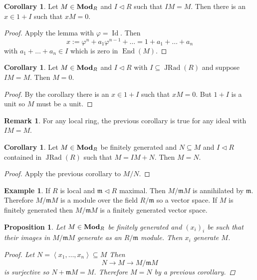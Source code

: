 \documentclass{article}
\DeclareMathOperator{\Id}{Id}
\DeclareMathOperator{\End}{End}
\DeclareMathOperator{\modules}{{\bf Mod}}
\newcommand{\gen}[1]{\left<#1\right>}
\DeclareMathOperator{\JRad}{JRad}
\newcommand{\maxid}{\mathfrak{m}}
\newcommand{\ideal}{\triangleleft}
\newtheorem{proposition}[theorem]{Proposition}
\theoremstyle{definition}
\newtheorem{remark}[theorem]{Remark}
\newtheorem{example}[theorem]{Example}
\newtheorem{corollary}[theorem]{Corollary}
\begin{document}
\begin{corollary}
    Let \(M\in\modules_{R}\) and \(I\ideal R\) such that \(IM=M\). Then there is
    an \(x\in 1+I\) such that \(xM=0\).

    \begin{proof}
        Apply the lemma with \(\varphi=\Id\). Then
        \[
            x:=\varphi^{n}+a_{1}\varphi^{n-1}+\ldots=1+a_{1}+\ldots+a_{n}
        \]
        with \(a_{1}+\ldots+a_{n}\in I\) which is zero in \(\End(M)\).
    \end{proof}
\end{corollary}

\begin{corollary}
    Let \(M\in\modules_{R}\) and \(I\ideal R\) with \(I\subseteq\JRad(R)\)
    and suppose \(IM=M\). Then \(M=0\).

    \begin{proof}
        By the corollary there is an \(x\in 1+I\) such that \(xM=0\). But
        \(1+I\) is a unit so \(M\) must be a unit.
    \end{proof}
\end{corollary}

\begin{remark}
    For any local ring, the previous corollary is true for any ideal with
    \(IM=M\).
\end{remark}

\begin{corollary}
    Let \(M\in\modules_{R}\) be finitely generated and \(N\subseteq M\) and
    \(I\ideal R\) contained in \(\JRad(R)\) such that \(M=IM+N\). Then \(M=N\).

    \begin{proof}
        Apply the previous corollary to \(M/N\).
    \end{proof}
\end{corollary}

\begin{example}
    If \(R\) is local and \(\maxid\ideal R\) maximal. Then \(M/\maxid M\) is
    annihilated by \(\maxid\). Therefore \(M/\maxid M\) is a module over the
    field \(R/\maxid\) so a vector space. If \(M\) is finitely generated then
    \(M/\maxid M\) is a finitely generated vector space.
\end{example}

\begin{proposition}
    Let \(M\in\modules_{R}\) be finitely generated and \((x_{i})_{i}\) be such
    that their images in \(M/\maxid M\) generate as an \(R/\maxid\) module. Then
    \(x_{i}\) generate \(M\).

    \begin{proof}
        Let \(N=\gen{x_{1},\ldots,x_{n}}\subseteq M\) Then
        \[
            N\to M\to M/\maxid M
        \]
        is surjective so \(N+\maxid M=M\). Therefore \(M=N\) by a previous
        corollary.
    \end{proof}
\end{proposition}
\end{document}
